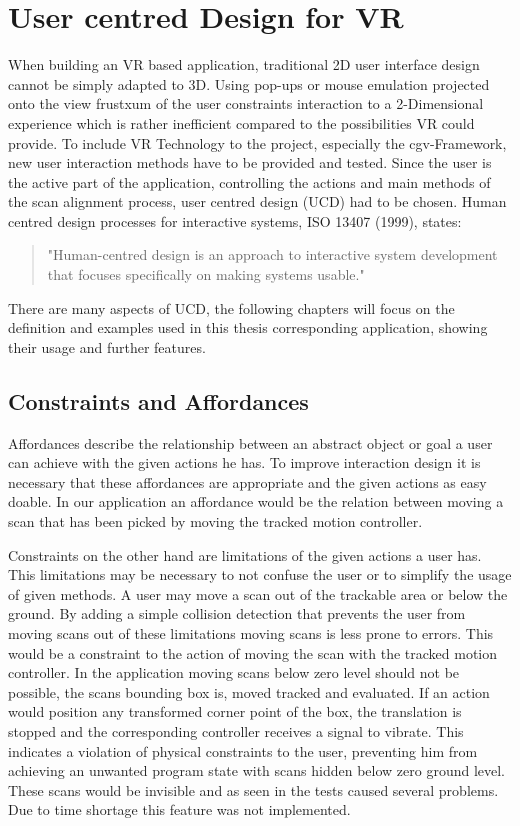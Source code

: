 \documentclass[hyperref,english,bachelorofscience,bibnum,twoside]{cgvpub}
\begin{document}
\section{User centred Design for VR}

When building an VR based application, traditional 2D user interface design cannot be simply adapted to 3D.
Using pop-ups or mouse emulation projected onto the view frustxum of the user constraints interaction to a 2-Dimensional experience which is rather inefficient compared to the possibilities VR could provide.
To include VR Technology to the project, especially the cgv-Framework, new user interaction methods have to be provided and tested. Since the user is the active part of the application, controlling the actions and main methods of the scan alignment process, user centred design (UCD) had to be chosen. 
Human centred design processes for interactive systems, ISO 13407 (1999), states: 
\begin{quote}
"Human-centred design is an approach to interactive system development that focuses specifically on making systems usable."\cite{w3ucdISO}
\end{quote}
There are many aspects of UCD, the following chapters will focus on the definition and examples used in this thesis corresponding application, showing their usage and further features.

\subsection{Constraints and Affordances}

Affordances describe the relationship between an abstract object or goal a user can achieve with the given actions he has\cite{Jerald2015}.
To improve interaction design it is necessary that these affordances are appropriate and the given actions as easy doable\cite{Jerald2015}.
In our application an affordance would be the relation between moving a scan that has been picked by moving the tracked motion controller. 

Constraints on the other hand are limitations of the given actions a user has. This limitations may be necessary to not confuse the user or to simplify the usage of given methods. A user may move a scan out of the trackable area or below the ground. By adding a simple collision detection that prevents the user from moving scans out of these limitations moving scans is less prone to errors. This would be a constraint to the action of moving the scan with the tracked motion controller. In the application moving scans below zero level should not be possible, the scans bounding box is, moved tracked and evaluated. If an action would position any transformed corner point of the box, the translation is stopped and the corresponding controller receives a signal to vibrate. This indicates a violation of physical constraints to the user, preventing him from achieving an unwanted program state with scans hidden below zero ground level. These scans would be invisible and as seen in the tests caused several problems. Due to time shortage this feature was not implemented.
\end{document}
